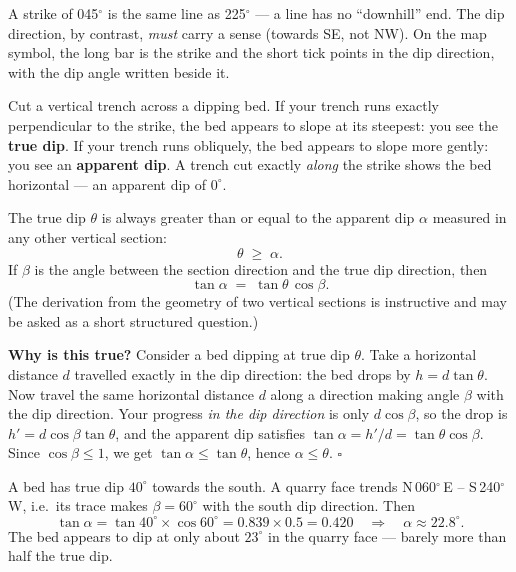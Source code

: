 \documentclass[11pt]{article}
\newcounter{popsec}
\newcounter{popsub}
\newcommand{\courssub}[1]{%
  \stepcounter{popsub}%
  \par\vspace{9pt}\noindent{\popxbold\fontsize{11.5}{13}\selectfont\color{popink}{\color{poporange}\thepopsec.\thepopsub}\hspace{6pt}#1}\par\nopagebreak\vspace{4pt}
}
\begin{document}
\begin{attention}
A strike of 045$^{\circ}$ is the same line as 225$^{\circ}$ --- a line has no ``downhill'' end. The dip direction, by contrast, \emph{must} carry a sense (towards SE, not NW). On the map symbol, the long bar is the strike and the short tick points in the dip direction, with the dip angle written beside it.
\end{attention}

\courssub{True Dip and Apparent Dip}

Cut a vertical trench across a dipping bed. If your trench runs exactly perpendicular to the strike, the bed appears to slope at its steepest: you see the \textbf{true dip}. If your trench runs obliquely, the bed appears to slope more gently: you see an \textbf{apparent dip}. A trench cut exactly \emph{along} the strike shows the bed horizontal --- an apparent dip of $0^{\circ}$.

\begin{propriete}
The true dip $\theta$ is always greater than or equal to the apparent dip $\alpha$ measured in any other vertical section:
\[
\theta \;\ge\; \alpha .
\]
If $\beta$ is the angle between the section direction and the true dip direction, then
\[
\tan \alpha \;=\; \tan \theta \, \cos \beta .
\]
(The derivation from the geometry of two vertical sections is instructive and may be asked as a short structured question.)
\end{propriete}

\textbf{Why is this true?} Consider a bed dipping at true dip $\theta$. Take a horizontal distance $d$ travelled exactly in the dip direction: the bed drops by $h = d\tan\theta$. Now travel the same horizontal distance $d$ along a direction making angle $\beta$ with the dip direction. Your progress \emph{in the dip direction} is only $d\cos\beta$, so the drop is $h' = d\cos\beta \tan\theta$, and the apparent dip satisfies $\tan\alpha = h'/d = \tan\theta\cos\beta$. Since $\cos\beta \le 1$, we get $\tan\alpha \le \tan\theta$, hence $\alpha \le \theta$. \hfill$\square$

\begin{exemplebox}
A bed has true dip $40^{\circ}$ towards the south. A quarry face trends N\,060$^{\circ}$\,E -- S\,240$^{\circ}$\,W, i.e.\ its trace makes $\beta = 60^{\circ}$ with the south dip direction. Then
\[
\tan\alpha = \tan 40^{\circ}\times \cos 60^{\circ} = 0.839 \times 0.5 = 0.420
\quad\Rightarrow\quad \alpha \approx 22.8^{\circ}.
\]
The bed appears to dip at only about $23^{\circ}$ in the quarry face --- barely more than half the true dip.
\end{exemplebox}
\end{document}
